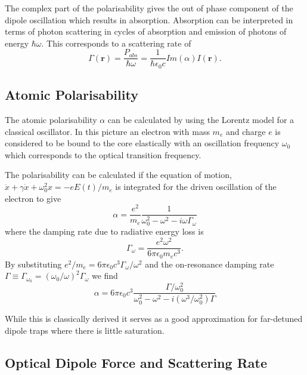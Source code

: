 The complex part of the polarisability gives the out of phase component of the dipole oscillation which results in absorption. Absorption can be interpreted in terms of photon scattering in cycles of absorption and emission of photons of energy $\hbar \omega$. This corresponds to a scattering rate of
\begin{equation}\label{eq:scattering_rate}
\Gamma(\boldsymbol r) = \frac{P_{abs}}{\hbar \omega} = \frac{1}{\hbar \epsilon_0 c} Im(\alpha) I(\boldsymbol r).
\end{equation}

\subsection{Atomic Polarisability}

The atomic polarisability $\alpha$ can be calculated by using the Lorentz model for a classical oscillator. In this picture an electron with mass $m_e$ and charge $e$ is considered to be bound to the core elastically with an oscillation frequency $\omega_0$ which corresponds to the optical transition frequency.

The polarisability can be calculated if the equation of motion, $\ddot{x} + \gamma \dot{x} + \omega_0^2 x = -eE(t)/m_e$ is integrated for the driven oscillation of the electron to give
\begin{equation} \label{eq:polarisability}
\alpha = \frac{e^2}{m_e} \frac{1}{\omega_0^2-\omega^2-i\omega\Gamma_\omega}
\end{equation}
where the damping rate due to radiative energy loss is
\begin{equation}\label{eq:damping_rate}
\Gamma_\omega=\frac{e^2\omega^2}{6\pi\epsilon_0m_ec^3}.
\end{equation}
By substituting $e^2/m_e=6\pi\epsilon_0 c^3\Gamma_\omega / \omega^2$ and the on-resonance damping rate $\Gamma \equiv \Gamma_{\omega_0} = (\omega_0/\omega)^2\Gamma_\omega$ we find
\begin{equation}\label{eq:final_polarisability}
\alpha = 6\pi \epsilon_0 c^3 \frac{\Gamma/\omega_0^2}{\omega_0^2 - \omega^2 - i(\omega^3/\omega_0^2)\Gamma}
\end{equation}

While this is classically derived it serves as a good approximation for far-detuned dipole traps where there is little saturation\cite{grimm_optical_2000}.

\subsection{Optical Dipole Force and Scattering Rate}

